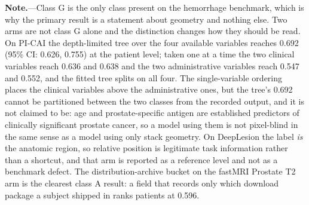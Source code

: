 \begin{table}[t]
\vspace{2pt}
\raggedright\scriptsize
\textbf{Note.}---Class G is the only class present on the hemorrhage benchmark,
which is why the primary result is a statement about geometry and nothing else.
Two arms are not class G alone and the distinction changes how they should be
read. On PI-CAI the depth-limited tree over the four
available variables reaches 0.692 (95\% CI: 0.626, 0.755) at the patient level;
taken one at a time the two clinical variables reach 0.636 and 0.638 and the two
administrative variables reach 0.547 and 0.552, and the fitted tree splits on all
four. The single-variable ordering places the clinical variables above the
administrative ones, but the tree's 0.692 cannot be partitioned between the two
classes from the recorded output, and it is not claimed to be: age and
prostate-specific antigen are established predictors of clinically significant
prostate cancer, so a model using them is not pixel-blind in the same sense as a
model using only stack geometry. On DeepLesion the label
\emph{is} the anatomic region, so relative position is legitimate task
information rather than a shortcut, and that arm is reported as a reference
level and not as a benchmark defect. The distribution-archive bucket on the
fastMRI Prostate T2 arm is the clearest class A result: a field that records only which
download package a subject shipped in ranks patients at 0.596.
\end{table}

